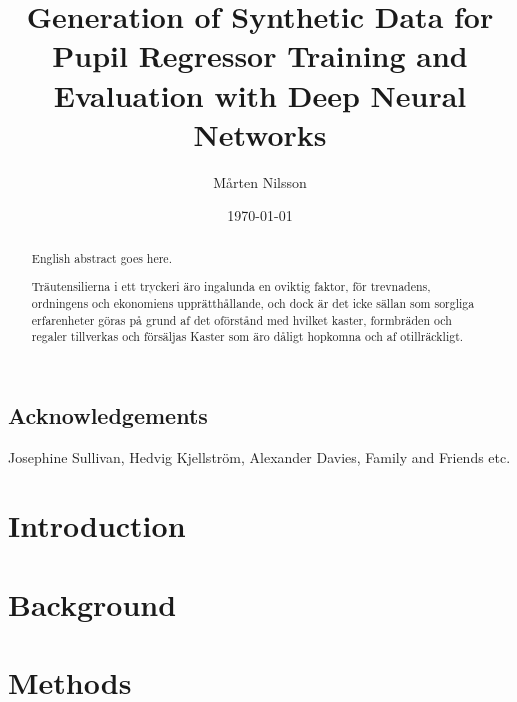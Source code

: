 \documentclass{kththesis}
\title{Generation of Synthetic Data for Pupil Regressor Training and Evaluation with Deep Neural Networks}
\author{Mårten Nilsson}
\date{\today}
\begin{document}
\frontmatter

\titlepage

\begin{abstract}
  English abstract goes here.

  \blindtext
\end{abstract}


\begin{otherlanguage}{swedish}
  \begin{abstract}
    Träutensilierna i ett tryckeri äro ingalunda en oviktig faktor,
    för trevnadens, ordningens och ekonomiens upprätthållande, och
    dock är det icke sällan som sorgliga erfarenheter göras på grund
    af det oförstånd med hvilket kaster, formbräden och regaler
    tillverkas och försäljas Kaster som äro dåligt hopkomna och af
    otillräckligt.
  \end{abstract}
\end{otherlanguage}

\section*{Acknowledgements}
Josephine Sullivan, Hedvig Kjellström, Alexander Davies, Family and Friends etc. 

\tableofcontents


\mainmatter


\chapter{Introduction}



\chapter{Background}


\chapter{Methods}

\end{document}
